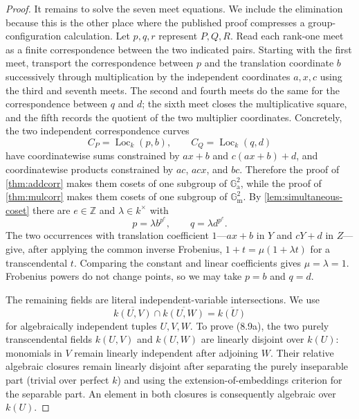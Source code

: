 \documentclass[11pt,oneside]{article}
\theoremstyle{definition}
\theoremstyle{remark}
\newcommand{\Ga}{\mathbb G_{\mathrm a}}
\newcommand{\Gm}{\mathbb G_{\mathrm m}}
\newcommand{\Loc}{\operatorname{Loc}}
\begin{document}
\begin{proof}
It remains to solve the seven meet equations.  We include the elimination because this is
the other place where the published proof compresses a group-configuration calculation.
Let $p,q,r$ represent $P,Q,R$.  Read each rank-one meet as a finite correspondence
between the two indicated pairs.  Starting with the first meet, transport the
correspondence between $p$ and the translation coordinate $b$ successively through
multiplication by the independent coordinates $a,x,c$ using the third and seventh meets.
The second and fourth meets do the same for the correspondence between $q$ and $d$; the
sixth meet closes the multiplicative square, and the fifth records the quotient of the two
multiplier coordinates.  Concretely, the two independent correspondence curves
\[
 C_P=\Loc_k(p,b),\qquad C_Q=\Loc_k(q,d)
\]
have coordinatewise sums constrained by $ax+b$ and $c(ax+b)+d$, and coordinatewise
products constrained by $ac$, $acx$, and $bc$.  Therefore the proof of
\cref{thm:addcorr} makes them cosets of one subgroup of $\Ga^2$, while the proof of
\cref{thm:mulcorr} makes them cosets of one subgroup of $\Gm^2$.  By
\cref{lem:simultaneous-coset} there are $e\in\mathbb Z$ and $\lambda\in k^\times$ with
\[
 p=\lambda b^{p^e},\qquad q=\lambda d^{p^e}.
\]
The two occurrences with translation coefficient $1$---$ax+b$ in $Y$ and
$cY+d$ in $Z$---give, after applying the common inverse Frobenius,
$1+t=\mu(1+\lambda t)$ for a transcendental $t$.  Comparing the constant and linear
coefficients gives $\mu=\lambda=1$.  Frobenius powers do not change points, so we may
take $p=b$ and $q=d$.

The remaining fields are literal independent-variable intersections.  We use
\[
 \overline{k(U,V)}\cap\overline{k(U,W)}=\overline{k(U)}          \tag{8.9a}
\]
for algebraically independent tuples $U,V,W$.  To prove (8.9a), the two purely
transcendental fields $k(U,V)$ and $k(U,W)$ are linearly disjoint over $k(U)$: monomials
in $V$ remain linearly independent after adjoining $W$.  Their relative algebraic
closures remain linearly disjoint after separating the purely inseparable part (trivial
over perfect $k$) and using the extension-of-embeddings criterion for the separable part.
An element in both closures is consequently algebraic over $k(U)$.


\end{proof}
\end{document}
